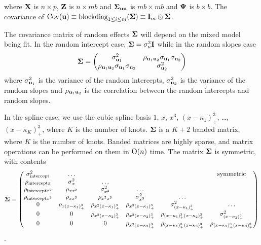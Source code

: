 \noindent where ${\bf X}$ is $n \times p$, ${\bf Z}$ is $n \times mb$ and ${\boldsymbol \Sigma}_{{\bf u} {\bf u}}$ is $mb \times mb$ and
${\boldsymbol \Psi}$ is $b \times b$. The covariance of $\mbox{Cov}({\bf u}) \equiv \text{blockdiag}_{1 \leq i \leq m} ({\boldsymbol \Sigma}) \equiv
{\bf I}_m \otimes {\boldsymbol\Sigma}$.

The covariance matrix of random effects ${\boldsymbol \Sigma}$ will depend on the mixed model being fit. In the random
intercept case, ${\boldsymbol \Sigma} = \sigma_u^2 {\bf I}$ while in the random slopes case
\[
	{\boldsymbol \Sigma} = 
	\begin{pmatrix}
		\sigma_{{\bf u}_1}^2                                 & \rho_{{\bf u}_1 {\bf u}_2} \sigma_{{\bf u}_1} \sigma_{{\bf u}_2} \\
		\rho_{{\bf u}_1 {\bf u}_2} \sigma_{{\bf u}_1} \sigma_{{\bf u}_2} & \sigma_{{\bf u}_2}^2                                 
	\end{pmatrix}
\]
where $\sigma_{{\bf u}_1}^2$ is the variance of the random intercepts, $\sigma_{{\bf u}_2}^2$ is the variance of the
random slopes and $\rho_{{\bf u}_1 {\bf u}_2}$ is the correlation between the random intercepts and random slopes.


In the spline case, we use the cubic spline basis $1$, $x$, $x^3$, $(x - \kappa_1)^3_+$, \ldots, $(x -
\kappa_K)^3_+$, where $K$ is the number of knots. ${\boldsymbol \Sigma}$ is a $K + 2$ banded matrix, where $K$ is the
number of knots. Banded matrices are highly sparse, and matrix operations can be performed on them in
$\text{O}(n)$ time. The matrix ${\boldsymbol \Sigma}$ is symmetric, with contents
\[
	{\boldsymbol \Sigma} =
	\begin{pmatrix}
		\sigma^2_{\text{intercept}} & \ldots                      &                             &                               &                                          & \text{symmetric}              \\
		\rho_{\text{intercept} x} & \sigma^2_x & \ldots\\
		\rho_{\text{intercept} x^2} & \rho_{x x^2} & \sigma^2_{x^2} & \ldots \\
		\rho_{\text{intercept} x^3} & \rho_{x x^3} & \rho_{x^2 x^3} & \sigma^2_{x^3} & \ldots \\
		0                           & \rho_{x (x - \kappa_1)^3_+} & \rho_{x^2 (x-\kappa_1)_+^3} & \rho_{x^3 (x - \kappa_1)_+^3} & \sigma^2_{(x - \kappa_1)_+^3}            & \ldots                        \\
		0                           & 0                           & \rho_{x^2 (x-\kappa_2)_+^3} & \rho_{x^3 (x-\kappa_2)_+^3}   & \rho_{(x-\kappa_1)_+^3 (x-\kappa_2)_+^3} & \sigma^2_{(x - \kappa_2)_+^3} \\
		0 & 0 & 0 & \rho_{x^3 (x - \kappa_3)_+^3} & \rho_{(x - \kappa_1)_+^3 (x - \kappa_3)_+^3} & \rho_{(x - \kappa_2)_+^3 (x - \kappa_3)_+^3} \\
	\end{pmatrix}
\].

